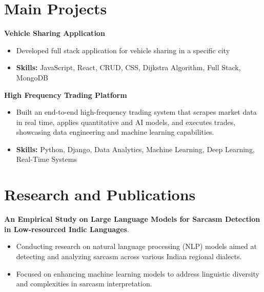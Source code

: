 \documentclass[a4paper,11pt]{article}
\begin{document}
\section{\textbf{Main Projects}}

\vspace{1mm}
  \textbf{Vehicle Sharing Application  }
\vspace{-1.5mm} %
\begin{itemize}
  \item Developed full stack application for vehicle sharing in a specific city
\vspace{-3mm}
  \item \textbf{Skills:} JavaScript, React, CRUD, CSS, Dijkstra Algorithm, Full Stack, MongoDB
\end{itemize}


\vspace{1mm}
   \textbf{High Frequency Trading Platform }
\vspace{-1.5mm} %
\begin{itemize}
  \item Built an end-to-end high-frequency trading system that scrapes market data in real time, applies quantitative and AI models, and executes trades, showcasing data engineering and machine learning capabilities.
\vspace{-3mm}
  \item \textbf{Skills:} Python, Django, Data Analytics, Machine Learning, Deep Learning, Real-Time Systems
\end{itemize}



\section{\textbf{Research and Publications} \hfill }
\vspace{1mm}
  \textbf{An Empirical Study on Large Language Models for Sarcasm Detection in Low-resourced Indic Languages}.
\vspace{-1mm} %
\begin{itemize}
  \item Conducting research on natural language processing (NLP) models aimed at detecting and analyzing sarcasm across various Indian regional dialects.
\vspace{-3mm}
  \item Focused on enhancing machine learning models to address linguistic diversity and complexities in sarcasm interpretation.
\end{itemize}
\end{document}
